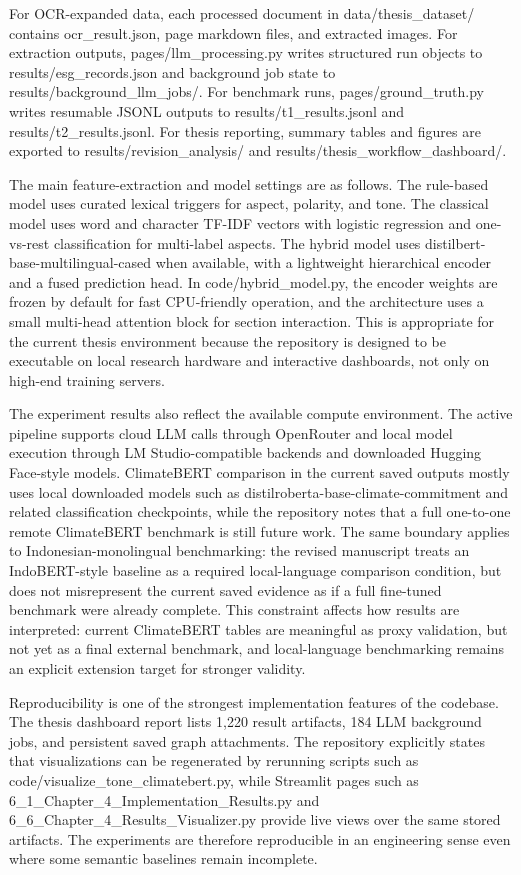 For OCR-expanded data, each processed document in data/thesis\_dataset/ contains ocr\_result.json, page markdown files, and extracted images. For extraction outputs, pages/llm\_processing.py writes structured run objects to results/esg\_records.json and background job state to results/background\_llm\_jobs/. For benchmark runs, pages/ground\_truth.py writes resumable JSONL outputs to results/t1\_results.jsonl and results/t2\_results.jsonl. For thesis reporting, summary tables and figures are exported to results/revision\_analysis/ and results/thesis\_workflow\_dashboard/.

The main feature-extraction and model settings are as follows. The rule-based model uses curated lexical triggers for aspect, polarity, and tone. The classical model uses word and character TF-IDF vectors with logistic regression and one-vs-rest classification for multi-label aspects. The hybrid model uses distilbert-base-multilingual-cased when available, with a lightweight hierarchical encoder and a fused prediction head. In code/hybrid\_model.py, the encoder weights are frozen by default for fast CPU-friendly operation, and the architecture uses a small multi-head attention block for section interaction. This is appropriate for the current thesis environment because the repository is designed to be executable on local research hardware and interactive dashboards, not only on high-end training servers.

The experiment results also reflect the available compute environment. The active pipeline supports cloud LLM calls through OpenRouter and local model execution through LM Studio-compatible backends and downloaded Hugging Face-style models. ClimateBERT comparison in the current saved outputs mostly uses local downloaded models such as distilroberta-base-climate-commitment and related classification checkpoints, while the repository notes that a full one-to-one remote ClimateBERT benchmark is still future work. The same boundary applies to Indonesian-monolingual benchmarking: the revised manuscript treats an IndoBERT-style baseline as a required local-language comparison condition, but does not misrepresent the current saved evidence as if a full fine-tuned benchmark were already complete. This constraint affects how results are interpreted: current ClimateBERT tables are meaningful as proxy validation, but not yet as a final external benchmark, and local-language benchmarking remains an explicit extension target for stronger validity.

Reproducibility is one of the strongest implementation features of the codebase. The thesis dashboard report lists 1,220 result artifacts, 184 LLM background jobs, and persistent saved graph attachments. The repository explicitly states that visualizations can be regenerated by rerunning scripts such as code/visualize\_tone\_climatebert.py, while Streamlit pages such as 6\_1\_Chapter\_4\_Implementation\_Results.py and 6\_6\_Chapter\_4\_Results\_Visualizer.py provide live views over the same stored artifacts. The experiments are therefore reproducible in an engineering sense even where some semantic baselines remain incomplete.

